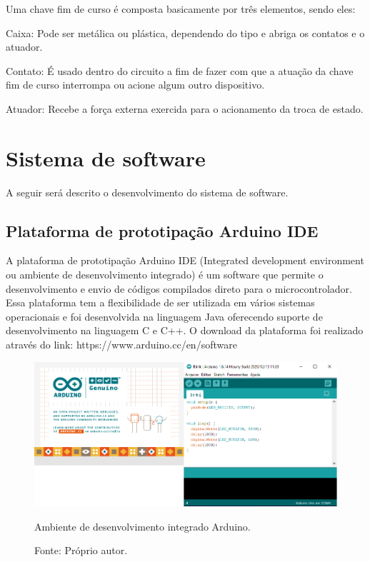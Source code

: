 Uma chave fim de curso é composta basicamente por três elementos, sendo eles:

\begin{alineas}
    \item Caixa: Pode ser metálica ou plástica, dependendo do tipo e abriga os contatos e o atuador.
    \item Contato: É usado dentro do circuito a fim de fazer com que a atuação da chave fim de curso interrompa ou 
    acione algum outro dispositivo.
    \item Atuador: Recebe a força externa exercida para o acionamento da troca de estado.
\end{alineas}

\section{Sistema de software}

A seguir será descrito o desenvolvimento do sistema de software.

\subsection{Plataforma de prototipação Arduino IDE}

A plataforma de prototipação Arduino IDE (Integrated development environment ou ambiente de desenvolvimento 
integrado) é um software que permite o desenvolvimento e envio de códigos compilados direto para o 
microcontrolador. Essa plataforma tem a flexibilidade de ser utilizada em vários sistemas operacionais 
e foi desenvolvida na linguagem Java oferecendo suporte de desenvolvimento na linguagem C e C++. 
O download da plataforma foi realizado através do link: https://www.arduino.cc/en/software

\begin{figure}[!htb]
\centering
\includegraphics[scale = 0.5]{figuras/3-19}
\caption{Ambiente de desenvolvimento integrado Arduino.}
\caption*{Fonte: Próprio autor.}
\label{figidearduino}
\end{figure}
    
